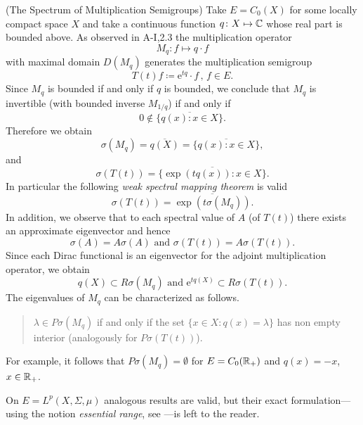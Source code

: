 \begin{example}{(The Spectrum of Multiplication Semigroups)}\label{ex:a3-2.3}
Take $E = C_{0}(X)$ for some locally compact space $X$ and take a continuous function $q \colon X \mapsto \mathbb{C}$ whose real part is bounded above.
As observed in A-I,2.3 the multiplication operator
\[
M_{q} \colon f \mapsto q \cdot f
\]
with maximal domain $D(M_{q})$ generates the multiplication semigroup
\[
T(t)f \coloneqq \mathrm{e}^{tq} \cdot f \, , \, f \in E .
\]
Since $M_{q}$ is bounded if and only if $q$ is bounded, we conclude that $M_{q}$ is invertible (with bounded inverse $M_{1/q}$) if and only if
\[
0 \notin \overline{\{q(x)  \colon x \in X\}} .
\]
Therefore we obtain
\[
\sigma(M_{q}) = \overline{q(X)} = \overline{\{q(x) \colon x \in X\}} ,
\]
and
\[
\sigma(T(t)) = \overline{\{\exp(tq(x)) \colon x \in X\}} .
\]
In particular the following \emph{weak spectral mapping theorem} is valid
\[
\sigma(T(t)) = \overline{\exp(t\sigma(M_{q}))} .
\]
In addition, we observe that to each spectral value of $A$ (\resp of $T(t)$) there exists an approximate eigenvector and hence
\[
\sigma(A) = A\sigma(A) \text{ and } \sigma(T(t)) = A\sigma(T(t)) .
\]
Since each Dirac functional is an eigenvector for the adjoint multiplication operator, we obtain
\[
q(X) \subset R\sigma(M_{q}) \text{ and } \mathrm{e}^{tq(X)} \subset R\sigma(T(t)) .
\]
The eigenvalues of $M_{q}$ can be characterized as follows.
\begin{quote}
$\lambda \in P\sigma(M_{q})$ if and only if the set $\{x \in X \colon q(x) = \lambda\}$ has non empty interior (analogously for $P\sigma(T(t))$).
\end{quote}
For example, it follows that $P\sigma(M_{q}) = \emptyset$ for $E = C_{0}(\mathbb{R}_{+})$ and $q(x) = -x$, $x \in \mathbb{R}_{+}$.

On $E = L^{p}(X,\Sigma,\mu)$ analogous results are valid, but their exact formulation---using the notion \emph{essential range}, see \citet{goldstein:1985a}---is left to the reader.
\end{example}
